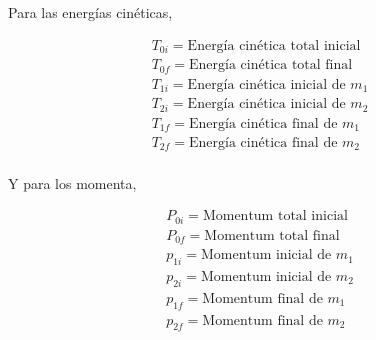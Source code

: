 \documentclass[a4paper,10pt]{article}
\numberwithin{equation}{section}
\begin{document}
 
Para las energías cinéticas,
 
 \begin{gather*}
  T_{0i} = \textrm{Energía cinética total inicial} \\
%
  T_{0f} = \textrm{Energía cinética total final} \\
%  
%  
   T_{1i} = \textrm{Energía cinética inicial de } m_1 \\
%   
   T_{2i} = \textrm{Energía cinética inicial de } m_2 \\
%  
  T_{1f} = \textrm{Energía cinética final de } m_1 \\
%  
  T_{2f} = \textrm{Energía cinética final de } m_2 \\
%
\label{eq:energiasCineticas}
  \end{gather*}
  
Y para los momenta,

 \begin{gather*}
  P_{0i} = \textrm{Momentum total inicial} \\
  P_{0f} = \textrm{Momentum total final} \\
%  
   p_{1i} = \textrm{Momentum inicial de } m_1 \\
%   
   p_{2i} = \textrm{Momentum inicial de } m_2 \\
%  
  p_{1f} = \textrm{Momentum final de } m_1 \\
%  
  p_{2f} = \textrm{Momentum final de } m_2 \\
%
\label{eq:Momenta}
  \end{gather*}
  
\end{document}
